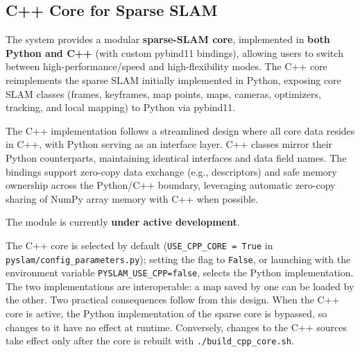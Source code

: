 \documentclass{article}
\begin{document}
\hypertarget{cpp-core}{%
\subsection{C++ Core for Sparse SLAM}\label{cpp-core}}

The system provides a modular \textbf{sparse-SLAM core}, implemented in \textbf{both Python and C++} (with custom pybind11 bindings), allowing users to switch between high-performance/speed and high-flexibility modes. The C++ core reimplements the sparse SLAM initially implemented in Python, exposing core SLAM classes (frames, keyframes, map points, maps, cameras, optimizers, tracking, and local mapping) to Python via pybind11.

The C++ implementation follows a streamlined design where all core data resides in C++, with Python serving as an interface layer. C++ classes mirror their Python counterparts, maintaining identical interfaces and data field names. The bindings support zero-copy data exchange (e.g., descriptors) and safe memory ownership across the Python/C++ boundary, leveraging automatic zero-copy sharing of NumPy array memory with C++ when possible.

The module is currently \textbf{under active development}.

The C++ core is selected by default (\texttt{USE\_CPP\_CORE = True} in \texttt{pyslam/config\_parameters.py}); setting the flag to \texttt{False}, or launching with the environment variable \texttt{PYSLAM\_USE\_CPP=false}, selects the Python implementation. The two implementations are interoperable: a map saved by one can be loaded by the other. Two practical consequences follow from this design. When the C++ core is active, the Python implementation of the sparse core is bypassed, so changes to it have no effect at runtime. Conversely, changes to the C++ sources take effect only after the core is rebuilt with \texttt{./build\_cpp\_core.sh}.
\end{document}
